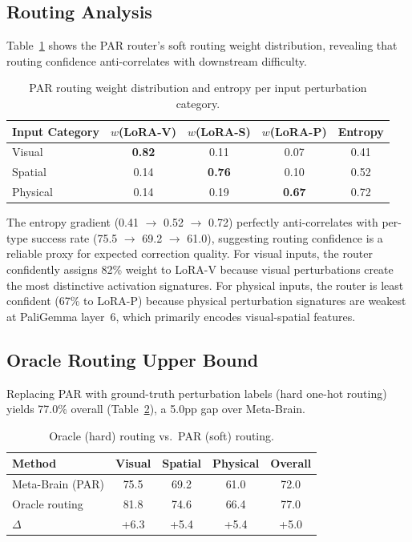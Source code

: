 \documentclass[10pt,twocolumn]{article}
\begin{document}
\subsection{Routing Analysis}
\label{sec:routing_analysis}

Table~\ref{tab:routing_weights} shows the PAR router's soft routing weight distribution, revealing that routing confidence anti-correlates with downstream difficulty.

\begin{table}[h]
\centering
\caption{PAR routing weight distribution and entropy per input perturbation category.}
\label{tab:routing_weights}
\small
\begin{tabular}{lcccc}
\toprule
Input Category & $w$(LoRA-V) & $w$(LoRA-S) & $w$(LoRA-P) & Entropy \\
\midrule
Visual & \textbf{0.82} & 0.11 & 0.07 & 0.41 \\
Spatial & 0.14 & \textbf{0.76} & 0.10 & 0.52 \\
Physical & 0.14 & 0.19 & \textbf{0.67} & 0.72 \\
\bottomrule
\end{tabular}
\end{table}

The entropy gradient (0.41 $\to$ 0.52 $\to$ 0.72) perfectly anti-correlates with per-type success rate (75.5 $\to$ 69.2 $\to$ 61.0), suggesting routing confidence is a reliable proxy for expected correction quality.
For visual inputs, the router confidently assigns 82\% weight to LoRA-V because visual perturbations create the most distinctive activation signatures.
For physical inputs, the router is least confident (67\% to LoRA-P) because physical perturbation signatures are weakest at PaliGemma layer~6, which primarily encodes visual-spatial features.

\subsection{Oracle Routing Upper Bound}
\label{sec:oracle}

Replacing PAR with ground-truth perturbation labels (hard one-hot routing) yields 77.0\% overall (Table~\ref{tab:oracle}), a 5.0pp gap over Meta-Brain.

\begin{table}[h]
\centering
\caption{Oracle (hard) routing vs.\ PAR (soft) routing.}
\label{tab:oracle}
\small
\begin{tabular}{lcccc}
\toprule
Method & Visual & Spatial & Physical & Overall \\
\midrule
Meta-Brain (PAR) & 75.5 & 69.2 & 61.0 & 72.0 \\
Oracle routing & 81.8 & 74.6 & 66.4 & 77.0 \\
$\Delta$ & +6.3 & +5.4 & +5.4 & +5.0 \\
\bottomrule
\end{tabular}
\end{table}
\end{document}
